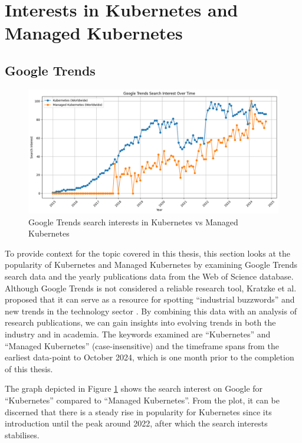 \section{Interests in Kubernetes and Managed Kubernetes}

\subsection{Google Trends}

\FloatBarrier  

\begin{figure}
    \centering
    \includegraphics[width=1\linewidth]{resources/d2a89eeeda76d50039bc6f5d3a97c41b.png}
    \caption{Google Trends search interests in Kubernetes vs Managed Kubernetes}
    \label{fig:search-interests-kubernetes-vs-managed-kubernetes}
\end{figure}

To provide context for the topic covered in this thesis, this section looks at the popularity of Kubernetes and Managed Kubernetes by examining Google Trends search data and the yearly publications data from the Web of Science database. Although Google Trends is not considered a reliable research tool, Kratzke et al. proposed that it can serve as a resource for spotting “industrial buzzwords” and new trends in the technology sector \cite{kratzke_understanding_2017}. By combining this data with an analysis of research publications, we can gain insights into evolving trends in both the industry and in academia. The keywords examined are “Kubernetes” and “Managed Kubernetes” (case-insensitive) and the timeframe spans from the earliest data-point to October 2024, which is one month prior to the completion of this thesis.

The graph depicted in Figure \ref{fig:search-interests-kubernetes-vs-managed-kubernetes} shows the search interest on Google for “Kubernetes” compared to “Managed Kubernetes”. From the plot, it can be discerned that there is a steady rise in popularity for Kubernetes since its introduction until the peak around 2022, after which the search interests stabilises.

